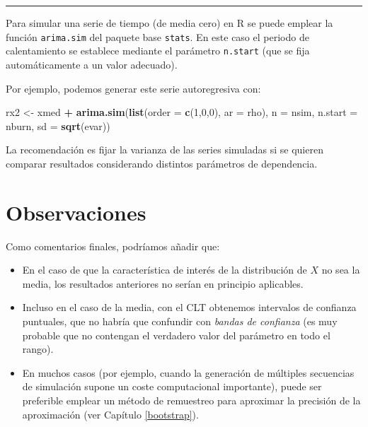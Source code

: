 \documentclass[
  spanish,
  10pt,
]{book}
\newenvironment{Shaded}{\begin{snugshade}}{\end{snugshade}}
\newcommand{\AttributeTok}[1]{\textcolor[rgb]{0.13,0.29,0.53}{#1}}
\newcommand{\DecValTok}[1]{\textcolor[rgb]{0.00,0.00,0.81}{#1}}
\newcommand{\FunctionTok}[1]{\textcolor[rgb]{0.13,0.29,0.53}{\textbf{#1}}}
\newcommand{\NormalTok}[1]{#1}
\newcommand{\OtherTok}[1]{\textcolor[rgb]{0.56,0.35,0.01}{#1}}
\newcommand{\SpecialCharTok}[1]{\textcolor[rgb]{0.81,0.36,0.00}{\textbf{#1}}}
\theoremstyle{break}
\theoremstyle{nonumberplain}
\begin{document}
\begin{center}\rule{0.5\linewidth}{0.5pt}\end{center}

Para simular una serie de tiempo (de media cero) en R se puede emplear la función \texttt{arima.sim} del paquete base \texttt{stats}.
En este caso el periodo de calentamiento se establece mediante el parámetro \texttt{n.start} (que se fija automáticamente a un valor adecuado).

Por ejemplo, podemos generar este serie autoregresiva con:

\begin{Shaded}
\begin{Highlighting}[]
\NormalTok{rx2 }\OtherTok{\textless{}{-}}\NormalTok{ xmed }\SpecialCharTok{+} \FunctionTok{arima.sim}\NormalTok{(}\FunctionTok{list}\NormalTok{(}\AttributeTok{order =} \FunctionTok{c}\NormalTok{(}\DecValTok{1}\NormalTok{,}\DecValTok{0}\NormalTok{,}\DecValTok{0}\NormalTok{), }\AttributeTok{ar =}\NormalTok{ rho), }\AttributeTok{n =}\NormalTok{ nsim, }
                        \AttributeTok{n.start =}\NormalTok{ nburn, }\AttributeTok{sd =} \FunctionTok{sqrt}\NormalTok{(evar))}
\end{Highlighting}
\end{Shaded}

La recomendación es fijar la varianza de las series simuladas si se quieren comparar
resultados considerando distintos parámetros de dependencia.

\section{Observaciones}\label{observaciones}

Como comentarios finales, podríamos añadir que:

\begin{itemize}
\item
  En el caso de que la característica de interés de la distribución de \(X\) no sea la media, los resultados anteriores no serían en principio aplicables.
\item
  Incluso en el caso de la media, con el CLT obtenemos intervalos de confianza puntuales, que no habría que confundir con \emph{bandas de confianza} (es muy probable que no contengan el verdadero valor del parámetro en todo el rango).
\item
  En muchos casos (por ejemplo, cuando la generación de múltiples secuencias de simulación supone un coste computacional importante), puede ser preferible emplear un método de remuestreo para aproximar la precisión de la aproximación (ver Capítulo \ref{bootstrap}).
\end{itemize}
\end{document}
